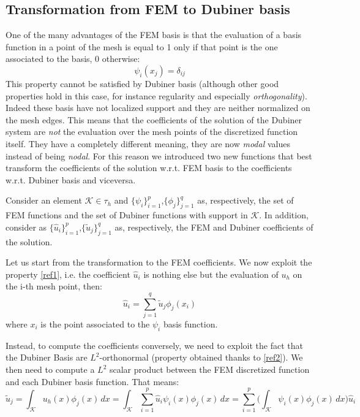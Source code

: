 \documentclass[a4paper]{article}
\begin{document}
\subsection{Transformation from FEM to Dubiner basis}
	One of the many advantages of the FEM basis is that the evaluation of a basis function in a point of the mesh is equal to 1 only if that point is the one associated to the basis, 0 otherwise:
	\begin{equation} \label{ref1}
	\psi_i(x_j)=\delta_{ij}
	\end{equation}
	This property cannot be satisfied by Dubiner basis (although other good properties hold in this case, for instance regularity and especially \emph{orthogonality}). Indeed these basis have not localized support and they are neither normalized on the mesh edges. This means that the coefficients of the solution of the Dubiner system are \emph{not} the evaluation over the mesh points of the discretized function itself. They have a completely different meaning, they are now \emph{modal} values instead of being \emph{nodal}.
	For this reason we introduced two new functions that best transform the coefficients of the solution w.r.t. FEM basis to the coefficients w.r.t. Dubiner basis and viceversa.\vspace{5mm}
	
	\noindent Consider an element $\mathcal{K}\in \tau_h$ and $\{\psi_{i}\}_{i=1}^{p}$,$\{\phi_{j}\}_{j=1}^{q}$ as, respectively, the set of FEM functions and the set of Dubiner functions with support in $\mathcal{K}$. In addition, consider as $\{\hat{u}_i\}_{i=1}^p$,$\{\tilde{u}_j\}_{j=1}^q$ as, respectively, the FEM and Dubiner coefficients of the solution. \vspace{5mm}
	
	\noindent Let us start from the transformation to the FEM coefficients. We now exploit the property \ref{ref1}, i.e. the coefficient $\hat{u}_i$ is nothing else but the evaluation of $u_h$ on the i-th mesh point, then: 
	\begin{equation} \label{ref3}
	\hat{u}_i = \sum_{j=1}^q \tilde{u}_j\phi_j(x_i)
	\end{equation}
	where $x_i$ is the point associated to the $\psi_i$ basis function. \vspace{5mm}
	
	\noindent Instead, to compute the coefficients conversely, we need to exploit the fact that the Dubiner Basis are $L^2$-orthonormal (property obtained thanks to \ref{ref2}). We then need to compute a $L^2$ scalar product between the FEM discretized function and each Dubiner basis function. That means:
	\begin{equation}\label{ref4}
	\tilde{u}_j = \int_\mathcal{K} u_h(x) \phi_j(x) \,dx = \int_{\mathcal{K}} \sum_{i=1}^p \hat{u}_i\psi_i(x) \phi_j(x) \,dx = \sum_{i=1}^p \Big(\int_{\mathcal{K}}\psi_i(x)\phi_j(x)\,dx \Big) \hat{u}_i
	\end{equation}
	
\end{document}
